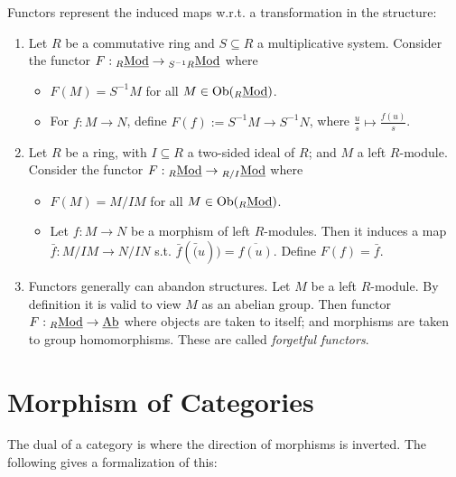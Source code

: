 \documentclass{article}
\begin{document}
\begin{example}
    Functors represent the induced maps w.r.t. a transformation in the structure:
    \begin{enumerate}
        \item Let $R$ be a commutative ring and $S \subseteq R$ a multiplicative system. Consider the functor $F: {}_{R}\underline{\textup{Mod}} \to {}_{S^{-1}R}\underline{\textup{Mod}}$ where
        \begin{itemize}
            \item $F(M) = S^{-1}M$ for all $M \in \mathrm{Ob}({}_{R}\underline{\textup{Mod}})$.
            \item For $f: M \to N$, define $F(f) := S^{-1}M \to S^{-1}N$, where $\frac{u}{s} \mapsto \frac{f(u)}{s}$.
        \end{itemize}
        \item Let $R$ be a ring, with $I \subseteq R$ a two-sided ideal of $R$; and $M$ a left $R$-module. Consider the functor $F: {}_{R}\underline{\textup{Mod}} \to {}_{R/I}\underline{\textup{Mod}}$ where
        \begin{itemize}
            \item $F(M) = M/IM$ for all $M \in \mathrm{Ob}({}_{R}\underline{\textup{Mod}})$. 
            \item Let $f: M \to N$ be a morphism of left $R$-modules. Then it induces a map $\bar{f}: M/IM \to N/IN$ s.t. $\bar{f}(\bar(u)) = \overline{f(u)}$. Define $F(f) = \bar{f}$.
        \end{itemize}
        \item Functors generally can abandon structures. Let $M$ be a left $R$-module. By definition it is valid to view $M$ as an abelian group. Then functor $F: {}_{R}\underline{\textup{Mod}} \to \underline{\textup{Ab}}$ where objects are taken to itself; and morphisms are taken to group homomorphisms. These are called \emph{forgetful functors}.
    \end{enumerate}
\end{example}

\section{Morphism of Categories}

The dual of a category is where the direction of morphisms is inverted. The following gives a formalization of this:
\end{document}
